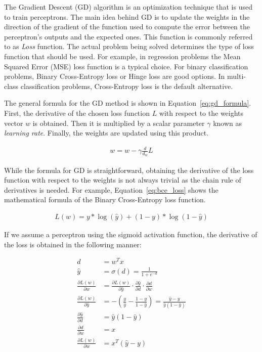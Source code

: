 The Gradient Descent (GD) algorithm is an optimization technique that is used to
train perceptrons. The main idea behind GD is to update the weights in the
direction of the gradient of the function used to compute the error between the
perceptron's outputs and the expected ones. This function is commonly referred
to as \textit{Loss} function. The actual problem being solved determines the
type of loss function that should be used. For example, in regression problems
the Mean Squared Error (MSE) loss function is a typical choice. For binary
classification problems, Binary Cross-Entropy loss or Hinge loss are good
options. In multi-class classification problems, Cross-Entropy loss is the
default alternative.

The general formula for the GD method is shown in Equation~\ref{eq:gd_formula}. First, the derivative of the chosen loss function $L$ with respect to the weights vector $w$ is obtained. Then it is multiplied by a scalar parameter $\gamma$ known as \textit{learning rate}. Finally, the weights are updated using this product.

\begin{align}
    w = w - \gamma \frac{d}{d_w}L
    \label{eq:gd_formula}
\end{align}

While the formula for GD is straightforward, obtaining the derivative of the
loss function with respect to the weights is not always trivial as the chain
rule of derivatives is needed. For example, Equation~\ref{eq:bce_loss} shows the
mathematical formula of the Binary Cross-Entropy loss function.

\begin{align}
    L(w) = y * \log(\hat{y}) + (1 - y) * \log(1 - \hat{y})
    \label{eq:bce_loss}
\end{align}

If we assume a perceptron using the sigmoid activation function, the derivative
of the loss is obtained in the following manner:

\begin{align}
    d &= w^T x \\
    \hat{y} &= \sigma(d) = \frac{1}{1 + e^{-d}} \\
    \frac{\partial L(w)}{\partial w} &= \frac{\partial L(w)}{\partial \hat{y}} \cdot \frac{\partial \hat{y}}{\partial d} \cdot \frac{\partial d}{\partial w}\\
    \frac{\partial L(w)}{\partial \hat{y}} &= -\left(\frac{y}{\hat{y}} - \frac{1
    - y}{1 - \hat{y}}\right) = \frac{\hat{y} - y}{\hat{y}(1-\hat{y})} \\
    \frac{\partial \hat{y}}{\partial d} &= \hat{y}(1 - \hat{y}) \\
    \frac{\partial d}{\partial w} &= x \\
    \frac{\partial L(w)}{\partial w} &= x^T(\hat{y}-y)
\end{align}


